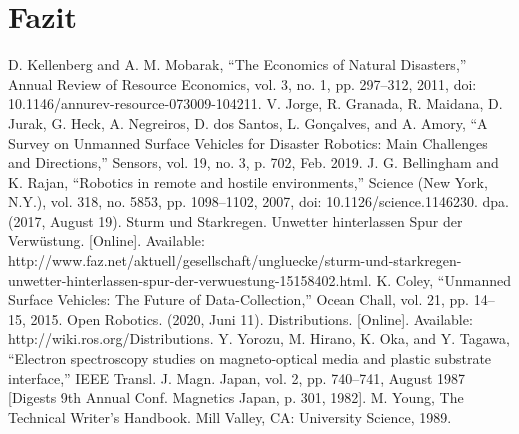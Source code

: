 \documentclass[conference]{IEEEtran}
\begin{document}
\section{Fazit}
\begin{thebibliography}{}
 D. Kellenberg and A. M. Mobarak, “The Economics of Natural Disasters,” Annual Review of Resource Economics, vol. 3, no. 1, pp. 297–312, 2011, doi: 10.1146/annurev-resource-073009-104211.
 V. Jorge, R. Granada, R. Maidana, D. Jurak, G. Heck, A. Negreiros, D. dos Santos, L. Gonçalves, and A. Amory, “A Survey on Unmanned Surface Vehicles for Disaster Robotics: Main Challenges and Directions,” Sensors, vol. 19, no. 3, p. 702, Feb. 2019.
 J. G. Bellingham and K. Rajan, “Robotics in remote and hostile environments,” Science (New York, N.Y.), vol. 318, no. 5853, pp. 1098–1102, 2007, doi: 10.1126/science.1146230.
 dpa. (2017, August 19). Sturm und Starkregen. Unwetter hinterlassen Spur der Verwüstung. [Online]. Available: http://www.faz.net/aktuell/gesellschaft/ungluecke/sturm-und-starkregen-unwetter-hinterlassen-spur-der-verwuestung-15158402.html.
 K. Coley, “Unmanned Surface Vehicles: The Future of Data-Collection,” Ocean Chall, vol. 21, pp. 14–15, 2015.
 Open Robotics. (2020, Juni 11). Distributions. [Online]. Available: http://wiki.ros.org/Distributions.
 Y. Yorozu, M. Hirano, K. Oka, and Y. Tagawa, ``Electron spectroscopy studies on magneto-optical media and plastic substrate interface,'' IEEE Transl. J. Magn. Japan, vol. 2, pp. 740--741, August 1987 [Digests 9th Annual Conf. Magnetics Japan, p. 301, 1982].
 M. Young, The Technical Writer's Handbook. Mill Valley, CA: University Science, 1989.
\end{thebibliography}
\end{document}
